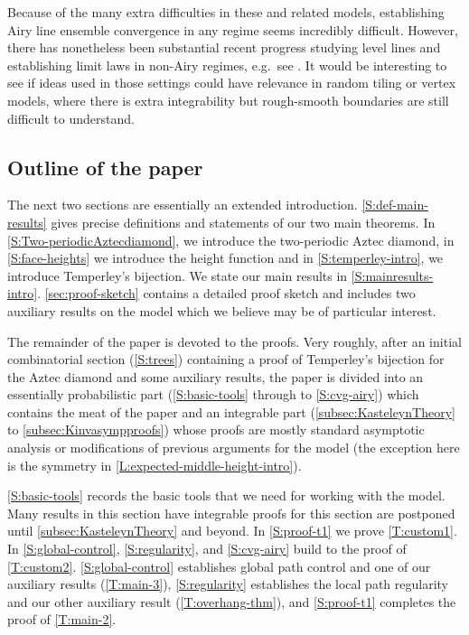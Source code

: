 \documentclass[11pt,twoside]{amsart}
\theoremstyle{plain}
\numberwithin{quest}{section}
\theoremstyle{remark}
\numberwithin{rem}{section}
\theoremstyle{definition}
\begin{document}
Because of the many extra difficulties in these and related models, establishing Airy line ensemble convergence in any regime seems incredibly difficult. However, there has nonetheless been substantial recent progress studying level lines and establishing limit laws in non-Airy regimes, e.g.\, see \cite{caputo2016scaling, caddeo2024level, chen2025limiting}. It would be interesting to see if ideas used in those settings could have relevance in random tiling or vertex models, where there is extra integrability but rough-smooth boundaries are still difficult to understand.
















\subsection{Outline of the paper} \label{S:outline-intro} 
The next two sections are essentially an extended introduction. \cref{S:def-main-results} gives precise definitions and statements of our two main theorems.
In \cref{S:Two-periodicAztecdiamond}, we introduce the two-periodic Aztec diamond, in \cref{S:face-heights} we introduce the height function and in \cref{S:temperley-intro}, we introduce Temperley's bijection.  We state our main results in \cref{S:mainresults-intro}. \cref{sec:proof-sketch} contains a detailed proof sketch and includes two auxiliary results on the model which we believe may be of particular interest. 

The remainder of the paper is devoted to the proofs.
    Very roughly, after an initial combinatorial section (\cref{S:trees}) containing a proof of Temperley's bijection for the Aztec diamond and some auxiliary results, the paper is divided into an essentially probabilistic part (\cref{S:basic-tools} through to \cref{S:cvg-airy}) which contains the meat of the paper and an integrable part (\cref{subsec:KasteleynTheory} to \cref{subsec:Kinvasympproofs}) whose proofs are mostly standard asymptotic analysis or modifications of previous arguments for the model (the exception here is the symmetry in \cref{L:expected-middle-height-intro}).
    
    \cref{S:basic-tools} records the basic tools that we need for working with the model. Many results in this section have integrable proofs for this section are postponed until \cref{subsec:KasteleynTheory} and beyond. In \cref{S:proof-t1} we prove \cref{T:custom1}. 
    In \cref{S:global-control}, \cref{S:regularity}, and \cref{S:cvg-airy} build to the proof of \cref{T:custom2}. \cref{S:global-control} establishes global path control and one of our auxiliary results (\cref{T:main-3}), \cref{S:regularity} establishes the local path regularity and our other auxiliary result (\cref{T:overhang-thm}), and \cref{S:proof-t1} completes the proof of \cref{T:main-2}. 
    
\end{document}
